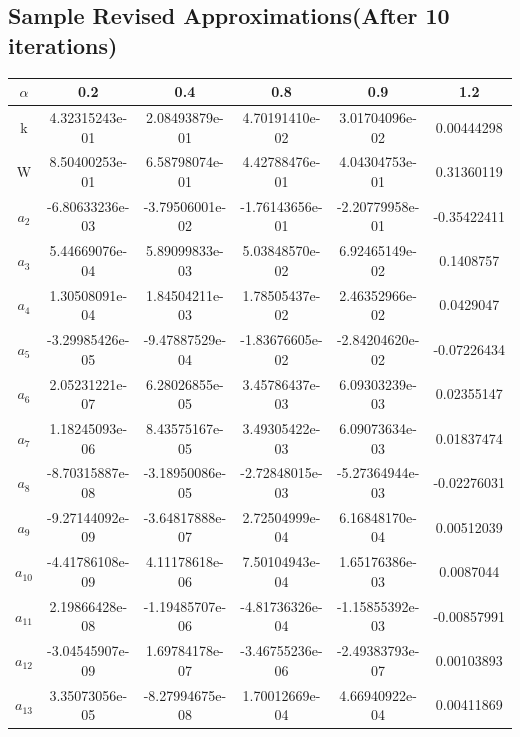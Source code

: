 \documentclass[10pt,a4paper,final]{report}
\begin{document}
\subsection{Sample Revised Approximations(After 10 iterations)}
\begin{tabular}{|c|c|c|c|c|c|}
\hline
\rule[-1ex]{0pt}{2.5ex} $\alpha$ & 0.2 & 0.4 & 0.8 & 0.9 & 1.2 \\ 
\hline 
\rule[-1ex]{0pt}{2.5ex} k & 4.32315243e-01 & 2.08493879e-01 & 4.70191410e-02 & 3.01704096e-02 & 0.00444298 \\ 
\hline
\rule[-1ex]{0pt}{2.5ex} W & 8.50400253e-01 & 6.58798074e-01 & 4.42788476e-01 & 4.04304753e-01 & 0.31360119 \\ 
\hline
\rule[-1ex]{0pt}{2.5ex} $a_2$ & -6.80633236e-03 & -3.79506001e-02 &  -1.76143656e-01 & -2.20779958e-01  & -0.35422411 \\ 
\hline 
\rule[-1ex]{0pt}{2.5ex} $a_3$ & 5.44669076e-04 &  5.89099833e-03 & 5.03848570e-02 & 6.92465149e-02 & 0.1408757 \\ 
\hline 
\rule[-1ex]{0pt}{2.5ex} $a_4$ & 1.30508091e-04 & 1.84504211e-03  & 1.78505437e-02 &  2.46352966e-02  & 0.0429047 \\ 
\hline 
\rule[-1ex]{0pt}{2.5ex} $a_5$ & -3.29985426e-05 & -9.47887529e-04  & -1.83676605e-02 & -2.84204620e-02 &  -0.07226434 \\ 
\hline 
\rule[-1ex]{0pt}{2.5ex} $a_6$ & 2.05231221e-07  &  6.28026855e-05 &  3.45786437e-03 & 6.09303239e-03 &  0.02355147 \\ 
\hline 
\rule[-1ex]{0pt}{2.5ex} $a_7$ & 1.18245093e-06 &  8.43575167e-05  & 3.49305422e-03  & 6.09073634e-03 & 0.01837474 \\ 
\hline 
\rule[-1ex]{0pt}{2.5ex} $a_8$ & -8.70315887e-08  & -3.18950086e-05  & -2.72848015e-03 & -5.27364944e-03 & -0.02276031 \\ 
\hline 
\rule[-1ex]{0pt}{2.5ex} $a_9$ & -9.27144092e-09  &  -3.64817888e-07  & 2.72504999e-04 & 6.16848170e-04 & 0.00512039 \\ 
\hline 
\rule[-1ex]{0pt}{2.5ex} $a_{10}$ & -4.41786108e-09 & 4.11178618e-06 & 7.50104943e-04  & 1.65176386e-03 & 0.0087044 \\ 
\hline 
\rule[-1ex]{0pt}{2.5ex} $a_{11}$ & 2.19866428e-08 &  -1.19485707e-06  & -4.81736326e-04 & -1.15855392e-03 & -0.00857991 \\ 
\hline 
\rule[-1ex]{0pt}{2.5ex} $a_{12}$ & -3.04545907e-09 &  1.69784178e-07  & -3.46755236e-06 & -2.49383793e-07 &  0.00103893 \\ 
\hline 
\rule[-1ex]{0pt}{2.5ex} $a_{13}$ & 3.35073056e-05  &  -8.27994675e-08 &  1.70012669e-04  & 4.66940922e-04 & 0.00411869 \\ 

\end{tabular}
\end{document}
